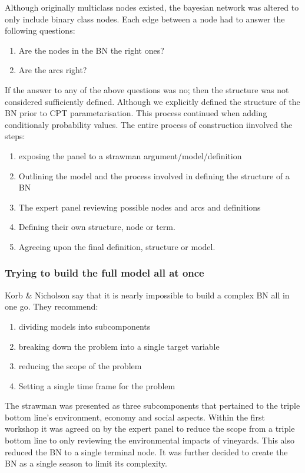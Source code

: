 Although originally multiclass nodes existed, the bayesian network was altered to only include binary class nodes. Each edge between a node had to answer the following questions:
\begin{enumerate}
        \item Are the nodes in the BN the right ones?
        \item Are the arcs right?
\end{enumerate}
If the answer to any of the above questions was no; then the structure was not considered sufficiently defined. Although we explicitly defined the structure of the BN prior to CPT parametarisation. This process continued when adding conditionaly probability values. The entire process of construction iinvolved the steps:
\begin{enumerate}
        \item exposing the panel to a strawman argument/model/definition
        \item Outlining the model and the process involved in defining the structure of a BN
        \item The expert panel reviewing possible nodes and arcs and definitions
        \item Defining their own structure, node or term.
        \item Agreeing upon the final definition, structure or model.
\end{enumerate}
\subsubsection{Trying to build the full model all at once}

Korb & Nicholson say that it is nearly impossible to build a complex BN all in one go. They recommend:
\begin{enumerate}
        \item dividing models into subcomponents
        \item breaking down the problem into a single target variable
        \item reducing the scope of the problem
        \item Setting a single time frame for the problem
\end{enumerate}
The strawman was presented as three subcomponents that pertained to the triple bottom line's environment, economy and social aspects.
Within the first workshop it was agreed on by the expert panel to reduce the scope from a triple bottom line to only reviewing the environmental impacts of vineyards. This also reduced the BN to a single terminal node. It was further decided to create the BN as a single season to limit its complexity.

